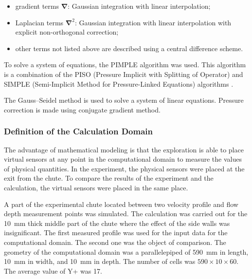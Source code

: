 \documentclass[sensors,article,submit,moreauthors,pdftex]{Definitions/mdpi}
\begin{document}
\begin{itemize}
	\item gradient terms $\boldsymbol{\nabla}$: Gaussian integration with linear interpolation;
	\item Laplacian terms $\boldsymbol{\nabla}^2$: Gaussian integration with linear interpolation with explicit non-orthogonal correction;
	\item other terms not listed above are described using a central difference scheme.
\end{itemize}

To solve a system of equations, the PIMPLE \cite{Holzmann2019, Yin2003} algorithm was used. This algorithm is a combination of the PISO (Pressure Implicit with Splitting of Operator) \cite{Issa1986_2} and SIMPLE (Semi-Implicit Method for Pressure-Linked Equations) algorithms \cite{Issa1986_1}.

The Gauss–Seidel method is used to solve a system of linear equations. Pressure correction is made using conjugate gradient method.

\subsubsection{Definition of the Calculation Domain}

The advantage of mathematical modeling is that the exploration is able to place virtual sensors at any point in the computational domain to measure the values of physical quantities. In the experiment, the physical sensors were placed at the exit from the chute. To compare the results of the experiment and the calculation, the virtual sensors were placed in the same place.

A part of the experimental chute located between two velocity profile and flow depth measurement points was simulated. The calculation was carried out for the 10~mm thick middle part of the chute where the effect of the side walls was insignificant. The first measured profile was used for the input data for the computational domain. The second one was the object of comparison. The geometry of the computational domain was a parallelepiped of 590~mm in length, 10~mm in width, and 10~mm in depth. The number of cells was $590 \times 10 \times 60$. The average value of Y+ was 17.
\end{document}
